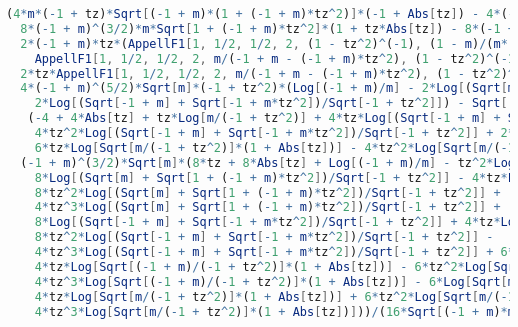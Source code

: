 \begin{lstlisting}[breaklines=true, caption={Expression for Type-II intraband transition with \( t_z < - 1 \), given in Mathematica format.\label{lst:typeii-intraband-tzneg}},language=Mathematica]
(4*m*(-1 + tz)*Sqrt[(-1 + m)*(1 + (-1 + m)*tz^2)]*(-1 + Abs[tz]) - 4*(-1 + m)*(-1 + tz)*Sqrt[m*(-1 + m*tz^2)]*(-1 + Abs[tz]) +
  8*(-1 + m)^(3/2)*m*Sqrt[1 + (-1 + m)*tz^2]*(1 + tz*Abs[tz]) - 8*(-1 + m)^2*Sqrt[m*(-1 + m*tz^2)]*(1 + tz*Abs[tz]) +
  2*(-1 + m)*tz*(AppellF1[1, 1/2, 1/2, 2, (1 - tz^2)^(-1), (1 - m)/(m*(-1 + tz^2))] -
    AppellF1[1, 1/2, 1/2, 2, m/(-1 + m - (-1 + m)*tz^2), (1 - tz^2)^(-1)]) -
  2*tz*AppellF1[1, 1/2, 1/2, 2, m/(-1 + m - (-1 + m)*tz^2), (1 - tz^2)^(-1)] -
  4*(-1 + m)^(5/2)*Sqrt[m]*(-1 + tz^2)*(Log[(-1 + m)/m] - 2*Log[(Sqrt[m] + Sqrt[1 + (-1 + m)*tz^2])/Sqrt[-1 + tz^2]] +
    2*Log[(Sqrt[-1 + m] + Sqrt[-1 + m*tz^2])/Sqrt[-1 + tz^2]]) - Sqrt[(-1 + m)*m]*(-1 + tz)*
   (-4 + 4*Abs[tz] + tz*Log[m/(-1 + tz^2)] + 4*tz*Log[(Sqrt[-1 + m] + Sqrt[-1 + m*tz^2])/Sqrt[-1 + tz^2]] +
    4*tz^2*Log[(Sqrt[-1 + m] + Sqrt[-1 + m*tz^2])/Sqrt[-1 + tz^2]] + 2*tz*Log[1 + Abs[tz]] -
    6*tz*Log[Sqrt[m/(-1 + tz^2)]*(1 + Abs[tz])] - 4*tz^2*Log[Sqrt[m/(-1 + tz^2)]*(1 + Abs[tz])]) +
  (-1 + m)^(3/2)*Sqrt[m]*(8*tz + 8*Abs[tz] + Log[(-1 + m)/m] - tz^2*Log[(-1 + m)/(-1 + tz^2)] + tz^2*Log[m/(-1 + tz^2)] -
    8*Log[(Sqrt[m] + Sqrt[1 + (-1 + m)*tz^2])/Sqrt[-1 + tz^2]] - 4*tz*Log[(Sqrt[m] + Sqrt[1 + (-1 + m)*tz^2])/Sqrt[-1 + tz^2]] +
    8*tz^2*Log[(Sqrt[m] + Sqrt[1 + (-1 + m)*tz^2])/Sqrt[-1 + tz^2]] +
    4*tz^3*Log[(Sqrt[m] + Sqrt[1 + (-1 + m)*tz^2])/Sqrt[-1 + tz^2]] +
    8*Log[(Sqrt[-1 + m] + Sqrt[-1 + m*tz^2])/Sqrt[-1 + tz^2]] + 4*tz*Log[(Sqrt[-1 + m] + Sqrt[-1 + m*tz^2])/Sqrt[-1 + tz^2]] -
    8*tz^2*Log[(Sqrt[-1 + m] + Sqrt[-1 + m*tz^2])/Sqrt[-1 + tz^2]] -
    4*tz^3*Log[(Sqrt[-1 + m] + Sqrt[-1 + m*tz^2])/Sqrt[-1 + tz^2]] + 6*Log[Sqrt[(-1 + m)/(-1 + tz^2)]*(1 + Abs[tz])] +
    4*tz*Log[Sqrt[(-1 + m)/(-1 + tz^2)]*(1 + Abs[tz])] - 6*tz^2*Log[Sqrt[(-1 + m)/(-1 + tz^2)]*(1 + Abs[tz])] -
    4*tz^3*Log[Sqrt[(-1 + m)/(-1 + tz^2)]*(1 + Abs[tz])] - 6*Log[Sqrt[m/(-1 + tz^2)]*(1 + Abs[tz])] -
    4*tz*Log[Sqrt[m/(-1 + tz^2)]*(1 + Abs[tz])] + 6*tz^2*Log[Sqrt[m/(-1 + tz^2)]*(1 + Abs[tz])] +
    4*tz^3*Log[Sqrt[m/(-1 + tz^2)]*(1 + Abs[tz])]))/(16*Sqrt[(-1 + m)*m]*(-1 + tz^2))
\end{lstlisting}


